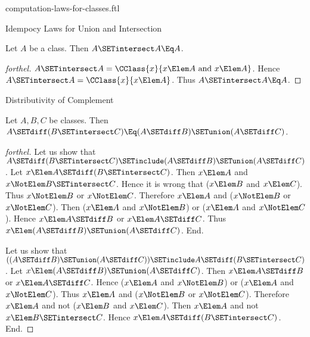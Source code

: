 \documentclass{stex}
\begin{document}
\begin{smodule}{computation-laws-for-classes.ftl}
\begin{sfragment}{Idempocy Laws for Union and Intersection}
  \begin{proposition}[forthel,id=FOUNDATIONS_02_4053144145231872]
    Let $A$ be a class.
    Then $A \SETintersect A \Eq A$.
  \end{proposition}
  \begin{proof}[forthel]
    $A \SETintersect A = \CClass{x}{x \Elem A\text{ and }x \Elem A}$.
    Hence $A \SETintersect A = \CClass{x}{x \Elem A}$.
    Thus $A \SETintersect A \Eq A$.
  \end{proof}
\end{sfragment}

\begin{sfragment}{Distributivity of Complement}
  \begin{proposition}[forthel,id=FOUNDATIONS_02_5296031436636160]
    Let $A, B, C$ be classes.
    Then $A \SETdiff (B \SETintersect C) \Eq (A \SETdiff B) \SETunion (A \SETdiff C)$.
  \end{proposition}
  \begin{proof}[forthel]
    Let us show that $A \SETdiff (B \SETintersect C) \SETinclude (A \SETdiff B) \SETunion (A \SETdiff C)$.
      Let $x \Elem A \SETdiff (B \SETintersect C)$.
      Then $x \Elem A$ and $x \NotElem B \SETintersect C$.
      Hence it is wrong that ($x \Elem B$ and $x \Elem C$).
      Thus $x \NotElem B$ or $x \NotElem C$.
      Therefore $x \Elem A$ and ($x \NotElem B$ or $x \NotElem C$).
      Then ($x \Elem A$ and $x \NotElem B$) or ($x \Elem A$ and $x \NotElem C$).
      Hence $x \Elem A \SETdiff B$ or $x \Elem A \SETdiff C$.
      Thus $x \Elem (A \SETdiff B) \SETunion (A \SETdiff C)$.
    End.

    Let us show that $((A \SETdiff B) \SETunion (A \SETdiff C)) \SETinclude A \SETdiff (B \SETintersect C)$. %
      Let $x \Elem (A \SETdiff B) \SETunion (A \SETdiff C)$.
      Then $x \Elem A \SETdiff B$ or $x \Elem A \SETdiff C$.
      Hence ($x \Elem A$ and $x \NotElem B$) or ($x \Elem A$ and $x \NotElem C$).
      Thus $x \Elem A$ and ($x \NotElem B$ or $x \NotElem C$).
      Therefore $x \Elem A$ and not ($x \Elem B$ and $x \Elem C$).
      Then $x \Elem A$ and not $x \Elem B \SETintersect C$.
      Hence $x \Elem A \SETdiff (B \SETintersect C)$.
    End.
  \end{proof}


\end{sfragment}
\end{smodule}
\end{document}
